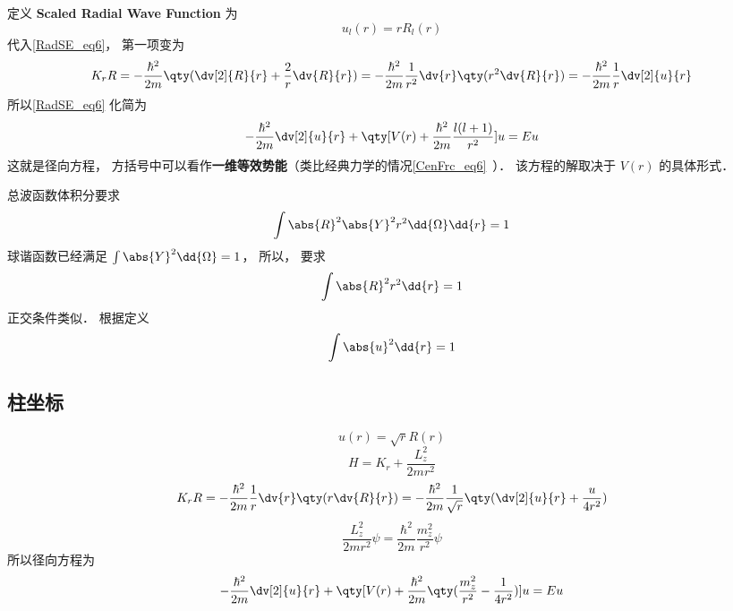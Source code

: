 定义 \textbf{Scaled Radial Wave Function} 为
\begin{equation}
u_l(r) = r R_l(r)
\end{equation}
代入\autoref{RadSE_eq6}， 第一项变为
\begin{equation}
K_r R =  - \frac{\hbar^2}{2m} \qty(\dv[2]{R}{r} + \frac2r \dv{R}{r}) = -\frac{\hbar^2}{2m}\frac{1}{r^2} \dv{r} \qty(r^2\dv{R}{r}) =  - \frac{\hbar^2}{2m}\frac1r \dv[2]{u}{r}
\end{equation}
所以\autoref{RadSE_eq6} 化简为
\begin{equation}\label{RadSE_eq1}
-\frac{\hbar^2}{2m} \dv[2]{u}{r} + \qty[V(r) + \frac{\hbar^2}{2m}\frac{l(l + 1)}{r^2}]u = Eu
\end{equation}
这就是径向方程， 方括号中可以看作\textbf{一维等效势能}（类比经典力学的情况\autoref{CenFrc_eq6}~）． 该方程的解取决于 $V(r)$ 的具体形式．


总波函数体积分要求
\begin{equation}
\int \abs{R}^2 \abs{Y}^2 r^2 \dd{\Omega}\dd{r}  = 1
\end{equation}
球谐函数已经满足 $\int \abs{Y}^2 \dd{\Omega} = 1$，  所以， 要求
\begin{equation}
\int \abs{R}^2 r^2 \dd{r}  = 1
\end{equation}
正交条件类似． 根据定义
\begin{equation}
\int \abs{u}^2 \dd{r}  = 1
\end{equation}

\subsection{柱坐标}
\begin{equation}
u(r) = \sqrt r R(r)
\end{equation}
\begin{equation}
 H = K_r + \frac{L_z^2}{2m r^2}
\end{equation}
\begin{equation}
K_r R = -\frac{\hbar^2}{2m} \frac1r \dv{r} \qty(r \dv{R}{r}) =  - \frac{\hbar^2}{2m} \frac{1}{\sqrt r} \qty(\dv[2]{u}{r} + \frac{u}{4 r^2})
\end{equation}
\begin{equation}
\frac{L_z^2}{2m r^2}\psi  = \frac{\hbar^2}{2m} \frac{m_z^2}{r^2}\psi 
\end{equation}
所以径向方程为
\begin{equation}
- \frac{\hbar^2}{2m} \dv[2]{u}{r} + \qty[V(r) + \frac{\hbar^2}{2m} \qty(\frac{m_z^2}{r^2} - \frac{1}{4 r^2})]u = Eu
\end{equation}

